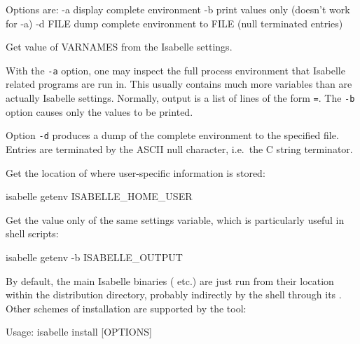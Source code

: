 \begin{isabellebody}
\begin{isamarkuptext}
\begin{ttbox}
  Options are:
    -a           display complete environment
    -b           print values only (doesn't work for -a)
    -d FILE      dump complete environment to FILE
                 (null terminated entries)

  Get value of VARNAMES from the Isabelle settings.
\end{ttbox}

  With the \verb|-a| option, one may inspect the full process
  environment that Isabelle related programs are run in. This usually
  contains much more variables than are actually Isabelle settings.
  Normally, output is a list of lines of the form \verb|=|. The \verb|-b| option
  causes only the values to be printed.

  Option \verb|-d| produces a dump of the complete environment
  to the specified file.  Entries are terminated by the ASCII null
  character, i.e.\ the C string terminator.%
\end{isamarkuptext}%
\isamarkuptrue%
%
\isamarkuptrue%
%
\begin{isamarkuptext}%
Get the location of \hyperlink{setting.ISABELLE-HOME-USER}{\mbox{}} where
  user-specific information is stored:
\begin{ttbox}
isabelle getenv ISABELLE_HOME_USER
\end{ttbox}

  \medskip Get the value only of the same settings variable, which is
particularly useful in shell scripts:
\begin{ttbox}
isabelle getenv -b ISABELLE_OUTPUT
\end{ttbox}%
\end{isamarkuptext}%
\isamarkuptrue%
%
\isamarkuptrue%
%
\begin{isamarkuptext}%
By default, the main Isabelle binaries (\hyperlink{executable.isabelle}{\mbox{}} etc.)  are just run from their location within the
  distribution directory, probably indirectly by the shell through its
  \hyperlink{setting.PATH}{\mbox{}}.  Other schemes of installation are supported by the
  \hypertarget{tool.install}{\hyperlink{tool.install}{\mbox{}}} tool:
\begin{ttbox}
Usage: isabelle install [OPTIONS]


\end{ttbox}
\end{isamarkuptext}
\end{isabellebody}
